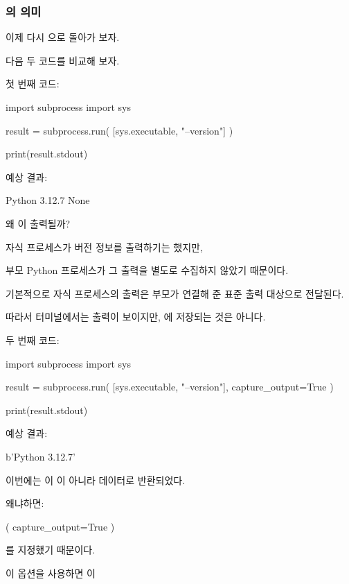\subsubsection{의 의미}

이제 다시 으로 돌아가 보자.

다음 두 코드를 비교해 보자.

첫 번째 코드:

\begin{dhkcode}
import subprocess
import sys

result = subprocess.run(
    [sys.executable, "--version"]
)

print(result.stdout)
\end{dhkcode}

예상 결과:

\begin{dhkzsh}
Python 3.12.7
None
\end{dhkzsh}

왜 이 출력될까?

자식 프로세스가 버전 정보를 출력하기는 했지만,

부모 Python 프로세스가 그 출력을 별도로 수집하지 않았기 때문이다.

기본적으로 자식 프로세스의 출력은 부모가 연결해 준 표준 출력 대상으로 전달된다.

따라서 터미널에서는 출력이 보이지만, 에 저장되는 것은 아니다.

두 번째 코드:

\begin{dhkcode}
import subprocess
import sys

result = subprocess.run(
    [sys.executable, "--version"],
    capture_output=True
)

print(result.stdout)
\end{dhkcode}

예상 결과:

\begin{dhkzsh}
b'Python 3.12.7\n'
\end{dhkzsh}

이번에는 이 이 아니라 데이터로 반환되었다.

왜냐하면:

\begin{dhkcode}
(
    capture_output=True
)
\end{dhkcode}

를 지정했기 때문이다.

이 옵션을 사용하면 이

